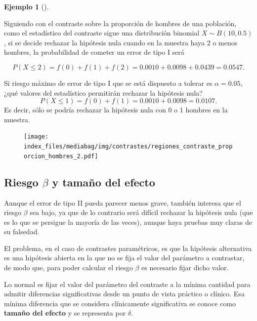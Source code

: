 \documentclass[
  a4paper,
]{scrreport}
\theoremstyle{definition}
\theoremstyle{definition}
\newtheorem{example}{Ejemplo}[chapter]
\theoremstyle{plain}
\theoremstyle{remark}
\begin{document}
\begin{example}[]\protect\hypertarget{exm-regiones-aceptacion-rechazo}{}\label{exm-regiones-aceptacion-rechazo}

Siguiendo con el contraste sobre la proporción de hombres de una
población, como el estadístico del contraste sigue una distribución
binomial \(X\sim B(10,0.5)\), si se decide rechazar la hipótesis nula
cuando en la muestra haya 2 o menos hombres, la probabilidad de cometer
un error de tipo I será

\[P(X\leq 2)= f(0)+f(1)+f(2)= 0.0010 + 0.0098 + 0.0439 = 0.0547.\]

Si riesgo máximo de error de tipo I que se está dispuesto a tolerar es
\(\alpha=0.05\), ¿qué valores del estadístico permitirán rechazar la
hipótesis nula? \[P(X\leq 1)= f(0)+f(1) = 0.0010 + 0.0098 = 0.0107.\] Es
decir, sólo se podría rechazar la hipótesis nula con 0 o 1 hombres en la
muestra.

\begin{figure}

{\centering \texttt{[image: index\_files/mediabag/img/contrastes/regiones\_contraste\_proporcion\_hombres\_2.pdf]}

}

\end{figure}

\end{example}

\hypertarget{riesgo-beta-y-tamauxf1o-del-efecto}{%
\subsection{\texorpdfstring{Riesgo \(\beta\) y tamaño del
efecto}{Riesgo \textbackslash beta y tamaño del efecto}}\label{riesgo-beta-y-tamauxf1o-del-efecto}}

Aunque el error de tipo II pueda parecer menos grave, también interesa
que el riesgo \(\beta\) sea bajo, ya que de lo contrario será difícil
rechazar la hipótesis nula (que es lo que se persigue la mayoría de las
veces), aunque haya pruebas muy claras de su falsedad.

El problema, en el caso de contrastes paramétricos, es que la hipótesis
alternativa es una hipótesis abierta en la que no se fija el valor del
parámetro a contrastar, de modo que, para poder calcular el riesgo
\(\beta\) es necesario fijar dicho valor.

Lo normal es fijar el valor del parámetro del contraste a la mínima
cantidad para admitir diferencias significativas desde un punto de vista
práctico o clínico. Esa mínima diferencia que se considera clínicamente
significativa se conoce como \textbf{tamaño del efecto} y se representa
por \(\delta\).
\end{document}
